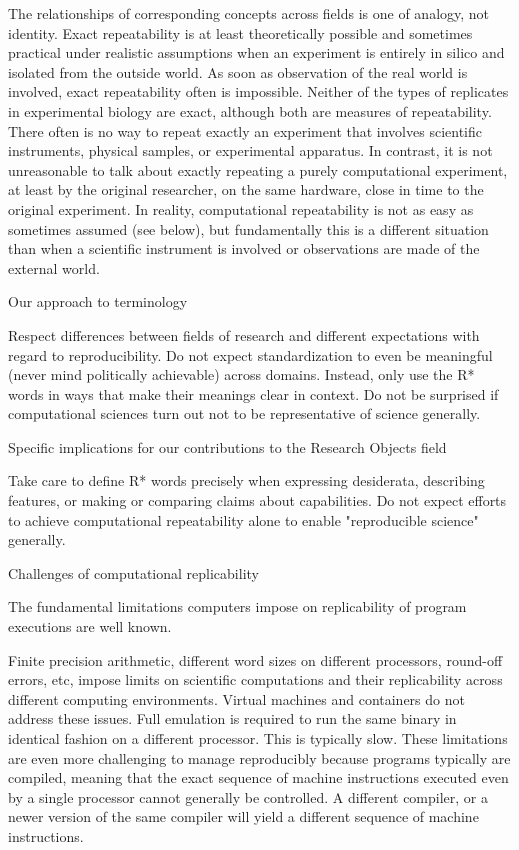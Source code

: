 			The relationships of corresponding concepts across fields is one of analogy, not identity.
			Exact repeatability is at least theoretically possible and sometimes practical under realistic assumptions when an experiment 
				is entirely in silico and isolated from the outside world.
			As soon as observation of the real world is involved, exact repeatability often is impossible.
			Neither of the types of replicates in experimental biology are exact, although both are measures of repeatability.
			There often is no way to repeat exactly an experiment that involves scientific instruments, physical samples, or experimental apparatus.
			In contrast, it is not unreasonable to talk about exactly repeating a purely computational experiment, at least by the original researcher,
				on the same hardware, close in time to the original experiment.
			In reality, computational repeatability is not as easy as sometimes assumed (see below), but fundamentally this is
				a different situation than when a scientific instrument is involved or observations are made of the external world.

		Our approach to terminology

			Respect differences between fields of research and different expectations with regard to reproducibility.
			Do not expect standardization to even be meaningful (never mind politically achievable) across domains.
			Instead, only use the R* words in ways that make their meanings clear in context.
			Do not be surprised if computational sciences turn out not to be representative of science generally.

		Specific implications for our contributions to the Research Objects field

			Take care to define R* words precisely when expressing desiderata, describing features, or making or comparing claims about capabilities. 
			Do not expect efforts to achieve computational repeatability alone to enable "reproducible science" generally.

	Challenges of computational replicability
	
		The fundamental limitations computers impose on replicability of program executions are well known.
	
			Finite precision arithmetic, different word sizes on different processors, round-off errors, etc, impose limits on scientific computations and 
				their replicability across different computing environments.
			Virtual machines and containers do not address these issues. Full emulation is required to run the same binary in identical fashion
				on a different processor.  This is typically slow.
			These limitations are even more challenging to manage reproducibly because programs typically are compiled, meaning that the
				exact sequence of machine instructions executed even by a single processor cannot generally be controlled.  A different compiler,
				or a newer version of the same compiler will yield a different sequence of machine instructions.

